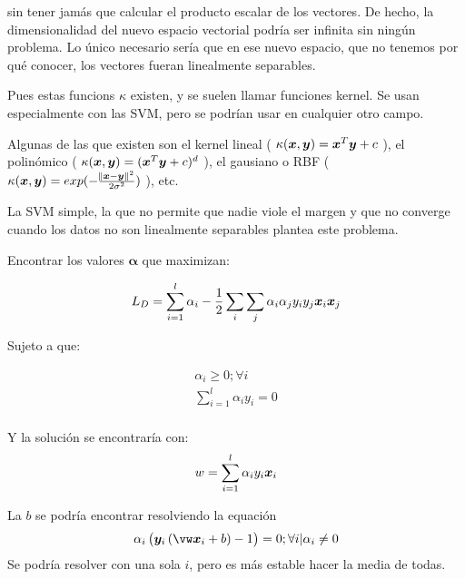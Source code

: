 sin tener jamás que calcular el producto escalar de los vectores. De hecho, la
dimensionalidad del nuevo espacio vectorial podría ser infinita sin ningún problema.
Lo único necesario sería que en ese nuevo espacio, que no tenemos por qué conocer,
los vectores fueran linealmente separables.

Pues estas funcions $\kappa$ existen, y se suelen llamar funciones kernel. Se usan
especialmente con las SVM, pero se podrían usar en cualquier otro campo.

Algunas de las que existen son el kernel lineal (
$\kappa(\bm{x}, \bm{y}) = \bm{x}^T\bm{y} + c$
), el polinómico (
$\kappa(\bm{x}, \bm{y}) = (\bm{x}^T\bm{y} + c)^d$
), el gausiano o RBF (
$\kappa(\bm{x}, \bm{y}) = exp(-\frac{\norm{\bm{x} - \bm{y}}^2}{2\sigma^2})$
), etc.

\begin{note}
  La SVM simple, la que no permite que nadie viole el margen y que no converge
  cuando los datos no son linealmente separables plantea este problema.

  Encontrar los valores $\bm{\alpha}$ que maximizan:

  \begin{equation}
    L_D = \sum_{i = 1}^{l} \alpha_i - \frac{1}{2}\sum_i\sum_j \alpha_i\alpha_jy_iy_j\bm{x}_i\bm{x}_j
  \end{equation}

  Sujeto a que:

  \begin{align}
    \alpha_i \geq 0; \forall i\\
    \sum_{i = 1}^l \alpha_iy_i = 0\\
  \end{align}

  Y la solución se encontraría con:
  \begin{equation}
    w = \sum_{i = 1}^l\alpha_iy_i\bm{x}_i
  \end{equation}

  La $b$ se podría encontrar resolviendo la equación
  \begin{equation}
    \alpha_i \left( \vy_i \left( \vw\vx_i + b \right) - 1 \right) = 0; \forall i |\alpha_i \neq 0
  \end{equation}
  Se podría resolver con una sola $i$, pero es más estable hacer la media de todas.



\end{note}

